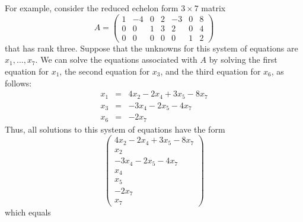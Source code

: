 \documentclass{ximera}
\begin{document}
For example, consider the reduced echelon form $3\times 7$ matrix
\begin{equation}  \label{E:nullityexamp}
A=\left(\begin{array}{rrrrrrr}
1 & -4 & 0 &  2 & -3 & 0 & 8 \\
0 &  0 & 1 &  3 &  2 & 0 & 4 \\
0 &  0 & 0 &  0 &  0 & 1 & 2  \end{array}\right)
\end{equation}
that has rank three. Suppose that the unknowns for this system of
equations are
$x_1,\ldots,x_7$.  We can solve the equations associated with
$A$ by solving the first equation for $x_1$, the second equation
for $x_3$, and the third equation for $x_6$, as follows:
\begin{eqnarray*}
x_1 & = & 4x_2 - 2x_4 + 3x_5 - 8x_7 \\
x_3 & = &      - 3x_4 - 2x_5 - 4x_7 \\
x_6 & = &                    - 2x_7
\end{eqnarray*}
Thus, all solutions to this system of equations have the form
\begin{equation}   \label{e:expandsoln}
\left(\begin{array}{c} 4x_2 - 2x_4 + 3x_5 - 8x_7 \\ x_2 \\
        -3x_4 - 2x_5 - 4x_7 \\ x_4 \\ x_5 \\  - 2x_7 \\ x_7 \end{array} \right)\end{equation}
  which equals
\end{document}
